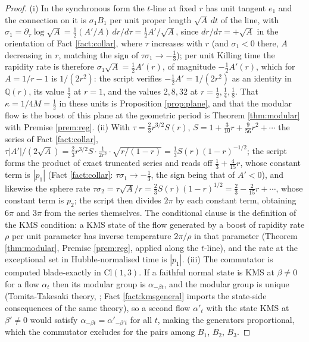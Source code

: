 \documentclass[11pt]{article}
\theoremstyle{definition}
\newcommand{\Cl}{\mathrm{Cl}}
\begin{document}
\begin{proof}
(i) In the synchronous form the $t$-line at fixed $r$ has unit tangent $e_1$ and the connection on it is $\sigma_1 B_1$ per unit proper length $\sqrt{A}\,dt$ of the line, with $\sigma_1 = \partial_\tau\log\sqrt A = \tfrac12 (A'/A)\,dr/d\tau = \tfrac12 A'/\sqrt{A}$, since $dr/d\tau = +\sqrt A$ in the orientation of Fact \ref{fact:collar}, where $\tau$ increases with $r$ (and $\sigma_1 < 0$ there, $A$ decreasing in $r$, matching the sign of $\tau\sigma_1 \to -\tfrac13$); per unit Killing time the rapidity rate is therefore $\sigma_1\sqrt A = \tfrac12 A'(r)$, of magnitude $-\tfrac12 A'(r)$, which for $A = 1/r - 1$ is $1/(2r^2)$: the script verifies $-\tfrac12 A' = 1/(2r^2)$ as an identity in $\mathbb{Q}(r)$, its value $\tfrac12$ at $r = 1$, and the values $2, 8, 32$ at $r = \tfrac12, \tfrac14, \tfrac18$. That $\kappa = 1/4M = \tfrac12$ in these units is Proposition \ref{prop:plane}, and that the modular flow is the boost of this plane at the geometric period is Theorem \ref{thm:modular} with Premise \ref{prem:reg}. (ii) With $\tau = \tfrac23 r^{3/2} S(r)$, $S = 1 + \tfrac{3}{10}r + \tfrac{9}{56}r^2 + \cdots$ the series of Fact \ref{fact:collar}, $\tau |A'|/(2\sqrt A) = \tfrac23 r^{3/2} S \cdot \tfrac{1}{2r^2} \cdot \sqrt{r/(1-r)} = \tfrac13 S(r)(1 - r)^{-1/2}$; the script forms the product of exact truncated series and reads off $\tfrac13 + \tfrac{4}{15}r$, whose constant term is $|p_1|$ (Fact \ref{fact:collar}: $\tau\sigma_1 \to -\tfrac13$, the sign being that of $A' < 0$), and likewise the sphere rate $\tau\sigma_2 = \tau\sqrt{A}/r = \tfrac23 S(r)(1 - r)^{1/2} = \tfrac23 - \tfrac{2}{15}r + \cdots$, whose constant term is $p_2$; the script then divides $2\pi$ by each constant term, obtaining $6\pi$ and $3\pi$ from the series themselves. The conditional clause is the definition of the KMS condition: a KMS state of the flow generated by a boost of rapidity rate $\rho$ per unit parameter has inverse temperature $2\pi/\rho$ in that parameter (Theorem \ref{thm:modular}, Premise \ref{prem:reg}, applied along the $t$-line), and the rate at the exceptional set in Hubble-normalised time is $|p_1|$. (iii) The commutator is computed blade-exactly in $\Cl(1,3)$. If a faithful normal state is KMS at $\beta \neq 0$ for a flow $\alpha_t$ then its modular group is $\alpha_{-\beta t}$, and the modular group is unique (Tomita-Takesaki theory, \cite[Sec.~5.3]{BR2}; Fact \ref{fact:kmsgeneral} imports the state-side consequences of the same theory), so a second flow $\alpha'_t$ with the state KMS at $\beta' \neq 0$ would satisfy $\alpha_{-\beta t} = \alpha'_{-\beta' t}$ for all $t$, making the generators proportional, which the commutator excludes for the pairs among $B_1$, $B_2$, $B_3$.
\end{proof}
\end{document}
